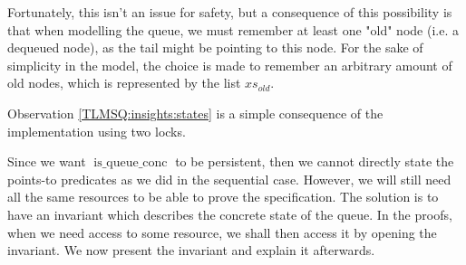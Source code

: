 \documentclass[twoside,11pt,openright]{report}
\newcommand{\isqueueconc}{\operatorname{is\_queue\_conc}}
\begin{document}
Fortunately, this isn't an issue for safety, but a consequence of this possibility is that when modelling the queue, we must remember at least one "old" node (i.e. a dequeued node), as the tail might be pointing to this node. For the sake of simplicity in the model, the choice is made to remember an arbitrary amount of old nodes, which is represented by the list $xs_{old}$.

Observation \ref{TLMSQ:insights:states} is a simple consequence of the implementation using two locks.

Since we want $\isqueueconc$ to be persistent, then we cannot directly state the points-to predicates as we did in the sequential case. However, we will still need all the same resources to be able to prove the specification. The solution is to have an invariant which describes the concrete state of the queue. In the proofs, when we need access to some resource, we shall then access it by opening the invariant. We now present the invariant and explain it afterwards.
\end{document}

